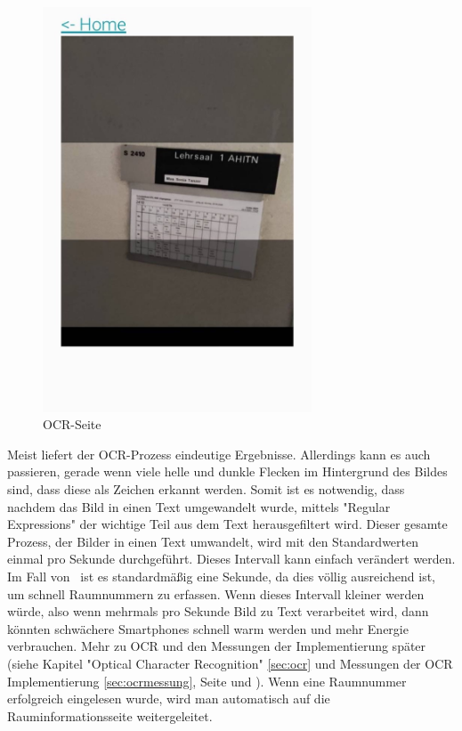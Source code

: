 \begin{figure}[H]
    \centering
    \includegraphics[width=80mm]{media/WebComponents/OCRSeite_light.jpg}
    \caption{OCR-Seite}
    \label{fig:ocrpage}
\end{figure}


Meist liefert der OCR-Prozess eindeutige Ergebnisse. Allerdings kann es auch passieren, gerade wenn viele helle und dunkle Flecken im Hintergrund des Bildes sind, dass diese als Zeichen erkannt werden. Somit ist es notwendig, dass nachdem das Bild in einen Text umgewandelt wurde, mittels "Regular Expressions" der wichtige Teil aus dem Text herausgefiltert wird. Dieser gesamte Prozess, der Bilder in einen Text umwandelt, wird mit den Standardwerten einmal pro Sekunde durchgeführt. Dieses Intervall kann einfach verändert werden. Im Fall von \ZELIA\ ist es standardmäßig eine Sekunde, da dies völlig ausreichend ist, um schnell Raumnummern zu erfassen. Wenn dieses Intervall kleiner werden würde, also wenn mehrmals pro Sekunde Bild zu Text verarbeitet wird, dann könnten schwächere Smartphones schnell warm werden und mehr Energie verbrauchen. Mehr zu OCR und den Messungen der Implementierung später (siehe Kapitel "Optical Character Recognition" \ref{sec:ocr} und Messungen der OCR Implementierung \ref{sec:ocrmessung}, Seite \pageref{sec:ocr} und \pageref{sec:ocrmessung}). Wenn eine Raumnummer erfolgreich eingelesen wurde, wird man automatisch auf die Rauminformationsseite weitergeleitet.

